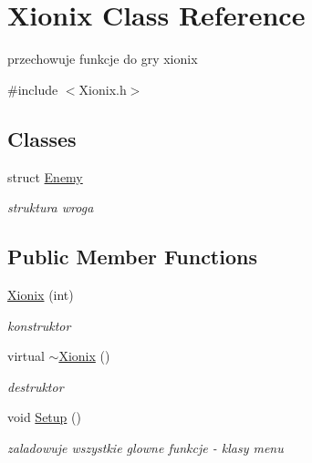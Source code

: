 \hypertarget{class_xionix}{}\section{Xionix Class Reference}
\label{class_xionix}


przechowuje funkcje do gry xionix  




{\ttfamily \#include $<$Xionix.\+h$>$}

\subsection*{Classes}
\begin{DoxyCompactItemize}
\item 
struct \mbox{\hyperlink{struct_xionix_1_1_enemy}{Enemy}}
\begin{DoxyCompactList}\small\item\em struktura wroga \end{DoxyCompactList}\end{DoxyCompactItemize}
\subsection*{Public Member Functions}
\begin{DoxyCompactItemize}
\item 
\mbox{\hyperlink{class_xionix_a19949767d2f31e6a1e4eb5c0e86ecb62}{Xionix}} (int)
\begin{DoxyCompactList}\small\item\em konstruktor \end{DoxyCompactList}\item 
\mbox{\label{class_xionix_a7d54256881a3d69f98aed8a4f503cb2f}} 
virtual \mbox{\hyperlink{class_xionix_a7d54256881a3d69f98aed8a4f503cb2f}{$\sim$\+Xionix}} ()
\begin{DoxyCompactList}\small\item\em destruktor \end{DoxyCompactList}\item 
\mbox{\label{class_xionix_acf09b974f3e1b65347fca5b4c5a05582}} 
void \mbox{\hyperlink{class_xionix_acf09b974f3e1b65347fca5b4c5a05582}{Setup}} ()
\begin{DoxyCompactList}\small\item\em zaladowuje wszystkie glowne funkcje -\/ klasy menu \end{DoxyCompactList}\end{DoxyCompactItemize}
